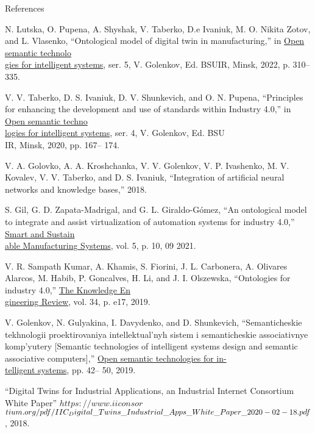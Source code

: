 \documentclass[twocolumn]{scndocument}
\begin{document}
\singlespacing
\begin{center}
    References
\end{center}
\begin{enumerate}[label=\textbf{[\arabic*]}]
  \printbibliography
\item \footnotesize {N. Lutska, O. Pupena, A. Shyshak, V. Taberko, D.e Ivaniuk, M. O. Nikita Zotov, and L. Vlasenko, “Ontological model of digital twin
in manufacturing,” in \underline{Open semantic technolo} \\ \underline{gies for intelligent systems}, ser. 5, V. Golenkov, Ed. BSUIR, Minsk, 2022, p.
310–335.
\item  V. V. Taberko, D. S. Ivaniuk, D. V. Shunkevich, and O. N. Pupena,
“Principles for enhancing the development and use of standards
within Industry 4.0,” in \underline{Open semantic techno} \\ \underline{logies for intelligent systems}, ser. 4, V. Golenkov, Ed. BSU \\ IR, Minsk, 2020, pp. 167–
174.
\item V. A. Golovko, A. A. Kroshchanka, V. V. Golenkov, V. P.
Ivashenko, M. V. Kovalev, V. V. Taberko, and D. S. Ivaniuk,
“Integration of artificial neural networks and knowledge bases,”
2018.
\item S. Gil, G. D. Zapata-Madrigal, and G. L. Giraldo-Gómez, “An ontological model to integrate and assist virtualization of automation
systems for industry 4.0,” \underline{Smart and Sustain} \\ 
\underline{able Manufacturing Systems}, vol. 5, p. 10, 09 2021.
\item  V. R. Sampath Kumar, A. Khamis, S. Fiorini, J. L. Carbonera, A. Olivares Alarcos, M. Habib, P. Goncalves, H. Li, and
J. I. Olszewska, “Ontologies for industry 4.0,” \underline{The Knowledge
En} \\ \underline{gineering Review}, vol. 34, p. e17, 2019.
\item  V. Golenkov, N. Gulyakina, I. Davydenko, and
D. Shunkevich, “Semanticheskie tekhnologii proektirovaniya
intellektual’nyh sistem i semanticheskie associativnye
komp’yutery [Semantic technologies of intelligent
systems design and semantic associative computers],”
\underline{Open semantic technologies for in-} \\ \underline{telligent systems}, pp. 42–
50, 2019.
\item  “Digital Twins for Industrial Applications, an Industrial Internet
Consortium White Paper” $https://www.iiconsor$ \\ $tium.org/pdf/IIC_
Digital\_Twins\_Industrial\_Ap\\ps\_White\_Paper\_2020-02-18.pdf$,
2018.

}
\end{enumerate}
\end{document}
